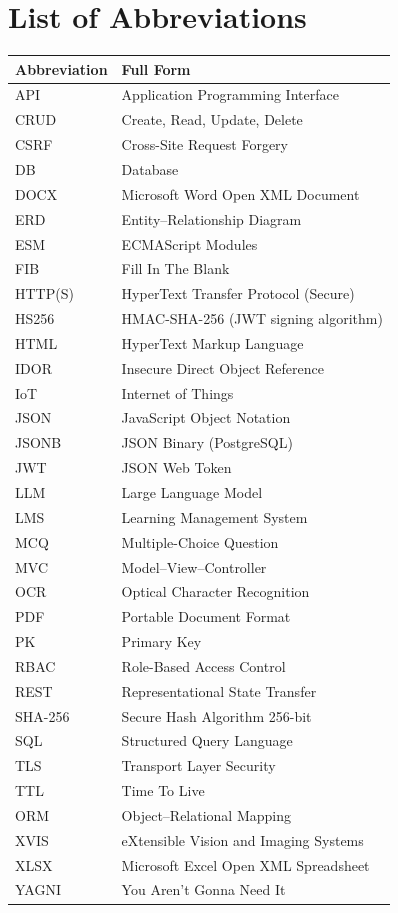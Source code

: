 \chapter*{List of Abbreviations}
\thispagestyle{fancy}

\begin{center}
\small
\begin{longtable}{@{}p{4.8cm}p{9.4cm}@{}}
\toprule
\textbf{Abbreviation} & \textbf{Full Form} \\
\midrule
\endhead
API & Application Programming Interface \\
CRUD & Create, Read, Update, Delete \\
CSRF & Cross-Site Request Forgery \\
DB & Database \\
DOCX & Microsoft Word Open XML Document \\
ERD & Entity--Relationship Diagram \\
ESM & ECMAScript Modules \\
FIB & Fill In The Blank \\
HTTP(S) & HyperText Transfer Protocol (Secure) \\
HS256 & HMAC-SHA-256 (JWT signing algorithm) \\
HTML & HyperText Markup Language \\
IDOR & Insecure Direct Object Reference \\
IoT & Internet of Things \\
JSON & JavaScript Object Notation \\
JSONB & JSON Binary (PostgreSQL) \\
JWT & JSON Web Token \\
LLM & Large Language Model \\
LMS & Learning Management System \\
MCQ & Multiple-Choice Question \\
MVC & Model--View--Controller \\
OCR & Optical Character Recognition \\
PDF & Portable Document Format \\
PK & Primary Key \\
RBAC & Role-Based Access Control \\
REST & Representational State Transfer \\
SHA-256 & Secure Hash Algorithm 256-bit \\
SQL & Structured Query Language \\
TLS & Transport Layer Security \\
TTL & Time To Live \\
ORM & Object--Relational Mapping \\
XVIS & eXtensible Vision and Imaging Systems \\
XLSX & Microsoft Excel Open XML Spreadsheet \\
YAGNI & You Aren't Gonna Need It \\
\bottomrule
\end{longtable}
\end{center}